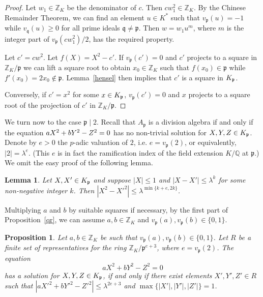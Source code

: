 \documentclass[a4paper]{amsart}
\def\Z{{\mathbb Z}}
\def\Q{{\mathbb Q}}
\def\Xp{{X'}}
\def\Yp{{Y'}}
\def\Zp{{Z'}}
\def\p{{\mathfrak p}}
\def\q{{\mathfrak q}}
\newtheorem{lemma}[theorem]{Lemma}
\newtheorem{proposition}[theorem]{Proposition}
\theoremstyle{definition}
\begin{document}
\begin{proof}
Let $w_1\in \Z_K$ be the denominator of $c$. Then $cw_1^2\in \Z_K$.
By the Chinese Remainder Theorem, we can find an element $u\in K^*$
such that $v_{\p}(u) = -1$ while $v_{\q}(u)\geq 0$ for all prime
ideals $\q \neq \p$.  Then $w = w_1 u^m$, where 
$m$ is the integer part of  $v_{\p}(cw_1^2)/2$, 
has the required property.

Let $c' = cw^2$. Let $f(X) = X^2 - c'$.  
If $v_{\p}(c') = 0$ and $c'$ projects to a square
in $\Z_K/\p$ we can lift a square root to obtain $x_0\in \Z_K$ such
that $f(x_0)\in \p$ while $f'(x_0) = 2x_0 \not\in \p$.
Lemma~\ref{hensel} then implies that $c'$ is a square in $\Kp$.

Conversely, if $c' = x^2$ for some $x \in \Kp$, $v_{\p}(c') = 0$ and $x$
projects to a square root of the projection of $c'$ in $\Z_K/\p$. 
\end{proof}

We turn now to the case $\p\mid 2$. Recall that 
$A_{\p}$ is a division algebra if
and only if the equation $aX^2 + bY^2 - Z^2 = 0$ has no non-trivial solution for $X,Y,Z
\in \Kp$. Denote by $e > 0$ the $p$-adic valuation of $2$, i.e. $e =
v_{\p}(2)$, or equivalently, $|2| = \lambda^e$. (This $e$ is in fact the
ramification index of the field extension $K/\Q$ at $\p$.) We omit the
easy proof of the following lemma.

\begin{lemma} \label{approx}
Let $X,X'\in \Kp$ and suppose $|X| \leq 1$ and $|X - X'| \leq \lambda^k$ for
some non-negative integer $k$. Then $|X^2 - {X'}^2| \leq
\lambda^{\min\{k+e,2k\}}$.
\end{lemma}

Multiplying $a$ and $b$ by suitable squares if necessary, by the first part of
Proposition~\ref{qr}, we can assume $a,b\in \Z_K$ and $v_{\p}(a),
v_{\p}(b) \in \{0,1\}$.

\begin{proposition} \label{lifting}
Let $a,b \in \Z_K$ be such that $v_{\p}(a), v_{\p}(b) \in \{0,1\}$. 
Let $R$ be a finite set of representatives for the ring $\Z_K /
\p^{e+3}$, where $e = v_{\p}(2)$. The equation
\begin{equation}
aX^2 + bY^2 - Z^2 = 0 \label{hilbert}
\end{equation}
has a solution for $X,Y,Z \in \Kp$, if and only if there exist elements
$\Xp,\Yp,\Zp \in R$ such that $|a\Xp^2 + b\Yp^2 - \Zp^2| \leq \lambda^{2e+3}$ and
$\max\{|\Xp|,|\Yp|,|\Zp|\} = 1$.
\end{proposition}
\end{document}
